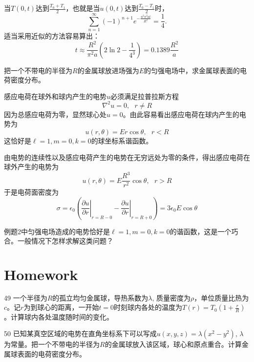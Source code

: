 \documentclass[CJK]{beamer}
\begin{document}
\begin{frame}
\bch
当$T(0,t)$达到$\frac{T_0+T_1}{2}$，也就是当$u(0,t)$达到$\frac{T_0-T_1}{2}$时，
$$\sum_{n=1}^\infty (-1)^{n+1} e^{-\frac{n^2\pi^2 at}{R^2}} = \frac{1}{4}.$$
适当采用近似的方法容易算出：
$$ t \approx \frac{R^2}{\pi^2a}\left(2\ln 2 - \frac{1}{4^3}\right) = 0.1389 \frac{R^2}{a} $$
\ech
\end{frame}



\begin{frame}
\bch


把一个不带电的半径为$R$的金属球放进场强为$E$的匀强电场中，求金属球表面的电荷密度分布。
\ech
\end{frame}


\begin{frame}
\bch

感应电荷在球外和球内产生的电势$u$必须满足拉普拉斯方程
$$\nabla^2 u = 0,\ \ \ r\ne R$$
因为总感应电荷为零，显然球心处$u=0$。由此容易看出感应电荷在球内产生的电势为
$$ u(r, \theta) = E r \cos\theta,\ \ \ r<R $$
这恰好是$\ell =1, m = 0, k=0$的球坐标系谐函数。

由电势的连续性以及感应电荷产生的电势在无穷远处为零的条件，得出感应电荷在球外产生的电势为
$$ u(r, \theta) = E \frac{R^3}{r^2}\cos\theta, \ \ \ r>R $$
于是电荷面密度为
$$\sigma =  \epsilon_0\left(\left.\frac{\partial u}{\partial r}\right\vert_{r=R-0}-\left.\frac{\partial u}{\partial r}\right\vert_{r=R+0}\right) = 3\epsilon_0E\cos\theta $$ 
\ech
\end{frame}



\begin{frame}
\bch


例题2中匀强电场造成的电势恰好是$\ell = 1, m = 0, k=0$的谐函数，这是一个巧合。一般情况下怎样求解这类问题？
\ech
\end{frame}




\section{Homework}

\begin{frame}
\bch
\bitem
\item[49]{一个半径为$R$的孤立均匀金属球，导热系数为$\lambda$, 质量密度为$\rho$，单位质量比热为$c$。记$r$为到球心的距离，一开始$t=0$时刻球内各处的温度为$T(r) = T_0\left(1+\frac{r}{R}\right)$。计算球内各处温度随时间的变化。}
\item[50]{已知某真空区域的电势在直角坐标系下可以写成$ u(x,y,z) = \lambda(x^2-y^2)$, $\lambda$为常量。把一个不带电的半径为$R$的金属球放入该区域，球心和原点重合。计算金属球表面的电荷密度分布。}
  
  \eitem
\ech
\end{frame}
\end{document}
